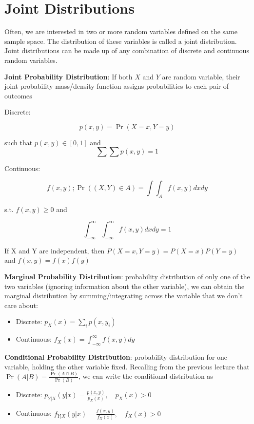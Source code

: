 \documentclass[]{book}
\providecommand{\tightlist}{%
  \setlength{\itemsep}{0pt}\setlength{\parskip}{0pt}}
\theoremstyle{definition}
\theoremstyle{definition}
\theoremstyle{definition}
\theoremstyle{remark}
\begin{document}
\section{Joint Distributions}\label{joint-distributions}

Often, we are interested in two or more random variables defined on the
same sample space. The distribution of these variables is called a joint
distribution. Joint distributions can be made up of any combination of
discrete and continuous random variables.

\textbf{Joint Probability Distribution}: If both \(X\) and \(Y\) are
random variable, their joint probability mass/density function assigns
probabilities to each pair of outcomes

Discrete:

\[p(x, y) = \Pr(X = x, Y = y)\]

such that \(p(x,y) \in [0,1]\) and \[\sum\sum p(x,y) = 1\]

Continuous:

\[f(x,y);\Pr((X,Y) \in A) = \int\!\!\!\int_A f(x,y)dx dy \]

s.t. \(f(x,y)\ge 0\) and

\[\int_{-\infty}^\infty\int_{-\infty}^\infty f(x,y)dxdy = 1\]

If X and Y are independent, then \(P(X=x,Y=y) = P(X=x)P(Y=y)\) and
\(f(x,y) = f(x)f(y)\)

\textbf{Marginal Probability Distribution}: probability distribution of
only one of the two variables (ignoring information about the other
variable), we can obtain the marginal distribution by
summing/integrating across the variable that we don't care about:

\begin{itemize}
\tightlist
\item
  Discrete: \(p_X(x) = \sum_i p(x, y_i)\)
\item
  Continuous: \(f_X(x) = \int_{-\infty}^\infty f(x,y)dy\)
\end{itemize}

\textbf{Conditional Probability Distribution}: probability distribution
for one variable, holding the other variable fixed. Recalling from the
previous lecture that \(\Pr(A|B)=\frac{\Pr(A\cap B)}{\Pr(B)}\), we can
write the conditional distribution as

\begin{itemize}
\tightlist
\item
  Discrete: \(p_{Y|X}(y|x) = \frac{p(x,y)}{p_X(x)}, \quad p_X(x) > 0\)
\item
  Continuous: \(f_{Y|X}(y|x) = \frac{f(x,y)}{f_X(x)},\quad f_X(x) > 0\)
\end{itemize}
\end{document}
